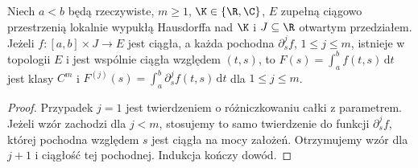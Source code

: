 \begin{twierdzenie}
\label{thm:higher-parametric15a}
Niech $a<b$ będą rzeczywiste, $m\ge1$, $\K\in\{\R,\C\}$,
$E$ zupełną ciągowo przestrzenią lokalnie wypukłą Hausdorffa
nad $\K$ i $J\subseteq\R$ otwartym przedziałem. Jeżeli $f:[a,b]\times J\to E$ jest ciągła, a każda
pochodna $\partial_s^j f$, $1\le j\le m$, istnieje
w topologii $E$ i jest wspólnie ciągła względem $(t,s)$,
to
$F(s)=\int_a^b f(t,s)\,\mathrm dt$ jest klasy $C^m$ i
$F^{(j)}(s)=\int_a^b\partial_s^j f(t,s)\,\mathrm dt$
dla $1\le j\le m$.
\end{twierdzenie}
\begin{proof}
Przypadek $j=1$ jest twierdzeniem o różniczkowaniu
całki z parametrem. Jeżeli wzór zachodzi dla $j<m$,
stosujemy to samo twierdzenie do funkcji $\partial_s^j f$,
której pochodna względem $s$ jest ciągła na mocy
założeń. Otrzymujemy wzór dla $j+1$ i ciągłość tej
pochodnej. Indukcja kończy dowód.
\end{proof}


